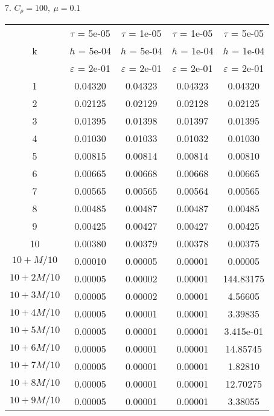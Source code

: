 7. $C_{\rho} = 100, \ \mu = 0.1$
\begin{center}
	\begin{tabular}{ |c|c|c|c|c| } 
		\hline
		& $\tau$ = 5e-05 & $\tau$ = 1e-05 & $\tau$ = 1e-05 & $\tau$ = 5e-05 \\ 
		k & $h$ = 5e-04 & $h$ = 5e-04 & $h$ = 1e-04 & $h$ = 1e-04 \\ 
		& $\varepsilon$ = 2e-01 & $\varepsilon$ = 2e-01 & $\varepsilon$ = 2e-01 & $\varepsilon$ = 2e-01 \\ 
		\hline
		1 & 0.04320 & 0.04323 & 0.04323 & 0.04320 \\
		\hline
		2 & 0.02125 & 0.02129 & 0.02128 & 0.02125 \\
		\hline
		3 & 0.01395 & 0.01398 & 0.01397 & 0.01395 \\
		\hline
		4 & 0.01030 & 0.01033 & 0.01032 & 0.01030 \\
		\hline
		5 & 0.00815 & 0.00814 & 0.00814 & 0.00810 \\
		\hline
		6 & 0.00665 & 0.00668 & 0.00668 & 0.00665 \\
		\hline
		7 & 0.00565 & 0.00565 & 0.00564 & 0.00565 \\
		\hline
		8 & 0.00485 & 0.00487 & 0.00487 & 0.00485 \\
		\hline
		9 & 0.00425 & 0.00427 & 0.00427 & 0.00425 \\
		\hline
		10 & 0.00380 & 0.00379 & 0.00378 & 0.00375 \\
		\hline
		$10 + M/10$ & 0.00010 & 0.00005 & 0.00001 & 0.00005 \\
		\hline
		$10 + 2M/10$ & 0.00005 & 0.00002 & 0.00001 & 144.83175 \\
		\hline
		$10 + 3M/10$ & 0.00005 & 0.00002 & 0.00001 & 4.56605 \\
		\hline
		$10 + 4M/10$ & 0.00005 & 0.00001 & 0.00001 & 3.39835 \\
		\hline
		$10 + 5M/10$ & 0.00005 & 0.00001 & 0.00001 & 3.415e-01 \\
		\hline
		$10 + 6M/10$ & 0.00005 & 0.00001 & 0.00001 & 14.85745 \\
		\hline
		$10 + 7M/10$ & 0.00005 & 0.00001 & 0.00001 & 1.82810 \\
		\hline
		$10 + 8M/10$ & 0.00005 & 0.00001 & 0.00001 & 12.70275 \\
		\hline
		$10 + 9M/10$ & 0.00005 & 0.00001 & 0.00001 & 3.38055 \\
		\hline
	\end{tabular}
\end{center}

